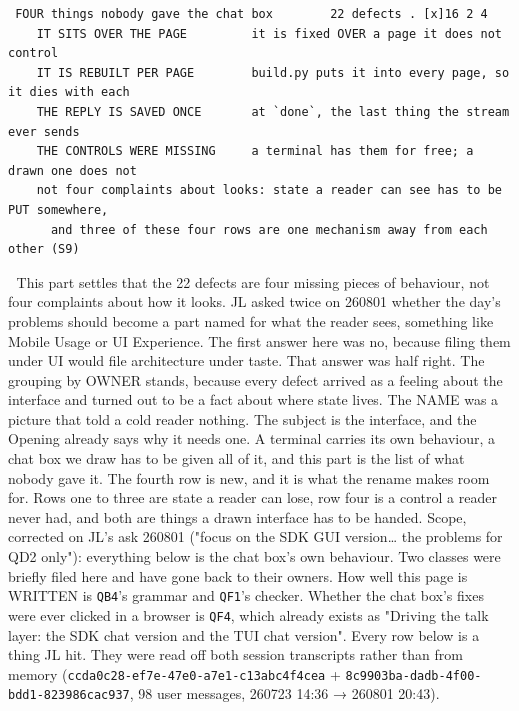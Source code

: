 \begin{verbatim}
 FOUR things nobody gave the chat box        22 defects . [x]16 2 4
    IT SITS OVER THE PAGE         it is fixed OVER a page it does not control
    IT IS REBUILT PER PAGE        build.py puts it into every page, so it dies with each
    THE REPLY IS SAVED ONCE       at `done`, the last thing the stream ever sends
    THE CONTROLS WERE MISSING     a terminal has them for free; a drawn one does not
    not four complaints about looks: state a reader can see has to be PUT somewhere,
      and three of these four rows are one mechanism away from each other (S9)
\end{verbatim}
📌 This part settles that the 22 defects are four missing pieces of behaviour, not four complaints about how it looks. JL asked twice on 260801 whether the day's problems should become a part named for what the reader sees, something like Mobile Usage or UI Experience. The first answer here was no, because filing them under UI would file architecture under taste. That answer was half right. The grouping by OWNER stands, because every defect arrived as a feeling about the interface and turned out to be a fact about where state lives. The NAME was a picture that told a cold reader nothing. The subject is the interface, and the Opening already says why it needs one. A terminal carries its own behaviour, a chat box we draw has to be given all of it, and this part is the list of what nobody gave it. The fourth row is new, and it is what the rename makes room for. Rows one to three are state a reader can lose, row four is a control a reader never had, and both are things a drawn interface has to be handed. Scope, corrected on JL's ask 260801 ("focus on the SDK GUI version… the problems for QD2 only"): everything below is the chat box's own behaviour. Two classes were briefly filed here and have gone back to their owners. How well this page is WRITTEN is \texttt{QB4}'s grammar and \texttt{QF1}'s checker. Whether the chat box's fixes were ever clicked in a browser is \texttt{QF4}, which already exists as "Driving the talk layer: the SDK chat version and the TUI chat version". Every row below is a thing JL hit. They were read off both session transcripts rather than from memory (\texttt{ccda0c28-ef7e-47e0-a7e1-c13abc4f4cea} + \texttt{8c9903ba-dadb-4f00-bdd1-823986cac937}, 98 user messages, 260723 14:36 → 260801 20:43).

